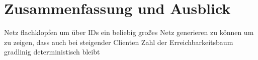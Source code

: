 \section{Zusammenfassung und Ausblick} 
Netz flachklopfen um über IDs ein beliebig großes Netz generieren zu können um zu zeigen, dass auch bei steigender Clienten Zahl der Erreichbarkeitsbaum gradlinig deterministisch bleibt